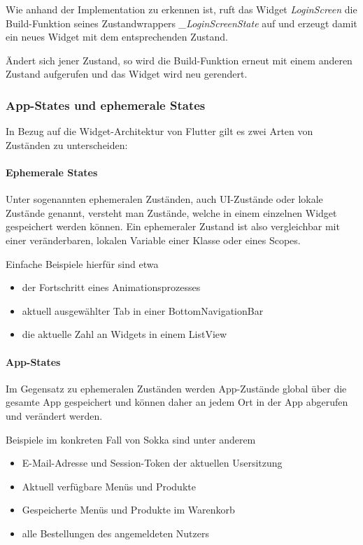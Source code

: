 Wie anhand der Implementation zu erkennen ist, ruft das Widget \textit{LoginScreen} die Build-Funktion
seines Zustandwrappers \textit{\_LoginScreenState} auf und erzeugt damit ein neues Widget mit dem entsprechenden
Zustand.

Ändert sich jener Zustand, so wird die Build-Funktion erneut mit einem anderen Zustand aufgerufen und das Widget wird neu gerendert.

\subsubsection{App-States und ephemerale States}


In Bezug auf die Widget-Architektur von Flutter gilt es zwei Arten von Zuständen zu unterscheiden:

\paragraph{Ephemerale States}

Unter sogenannten ephemeralen Zuständen, auch UI-Zustände oder lokale Zustände genannt, versteht man Zustände, welche in
einem einzelnen Widget gespeichert werden können. Ein ephemeraler Zustand ist also vergleichbar mit einer veränderbaren, lokalen Variable einer Klasse oder eines Scopes.

Einfache Beispiele hierfür sind etwa
\begin{itemize}
    \item der Fortschritt eines Animationsprozesses
    \item aktuell ausgewählter Tab in einer BottomNavigationBar
    \item die aktuelle Zahl an Widgets in einem ListView
\end{itemize}

\paragraph{App-States}

Im Gegensatz zu ephemeralen Zuständen werden App-Zustände global über die gesamte App gespeichert und können daher an jedem Ort in der App abgerufen und verändert werden.

Beispiele im konkreten Fall von Sokka sind unter anderem
\begin{itemize}
    \item E-Mail-Adresse und Session-Token der aktuellen Usersitzung
    \item Aktuell verfügbare Menüs und Produkte
    \item Gespeicherte Menüs und Produkte im Warenkorb
    \item alle Bestellungen des angemeldeten Nutzers
\end{itemize}

